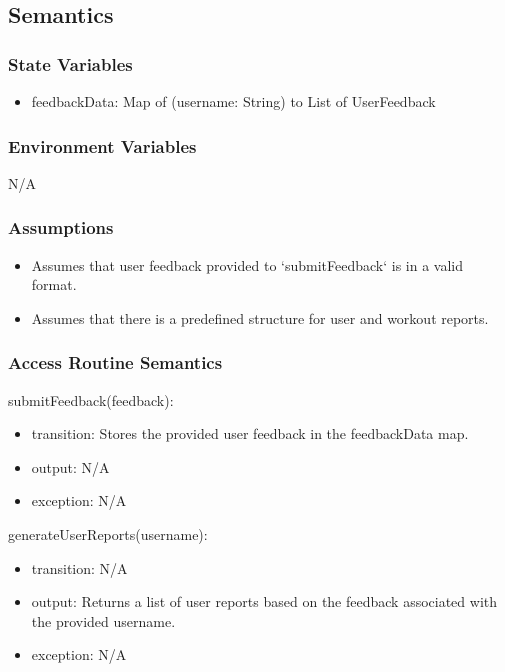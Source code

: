 \documentclass[12pt, titlepage]{article}
\begin{document}
\subsection{Semantics}

\subsubsection{State Variables}
\begin{itemize}
    \item feedbackData: Map of (username: String) to List of UserFeedback
\end{itemize}


\subsubsection{Environment Variables}
N/A

\subsubsection{Assumptions}
\begin{itemize}
\item Assumes that user feedback provided to `submitFeedback` is in a valid format.
\item Assumes that there is a predefined structure for user and workout reports.
\end{itemize}


\subsubsection{Access Routine Semantics}

\noindent submitFeedback(feedback):
\begin{itemize}
\item transition: Stores the provided user feedback in the feedbackData map.
\item output: N/A
\item exception: N/A
\end{itemize}

\noindent generateUserReports(username):
\begin{itemize}
\item transition: N/A
\item output:  Returns a list of user reports based on the feedback associated with the provided username.
\item exception: N/A
\end{itemize}
\end{document}
